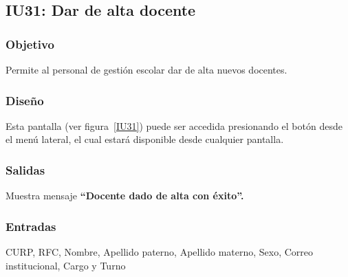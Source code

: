
\subsection{IU31: Dar de alta docente}
\subsubsection{Objetivo}
    Permite al personal de gestión escolar dar de alta nuevos docentes.
\subsubsection{Diseño}
    Esta pantalla  (ver figura~\ref{IU31}) puede ser accedida presionando el botón  desde el menú lateral, el cual estará disponible desde cualquier pantalla.

\subsubsection{Salidas}
Muestra mensaje {\bf ``Docente dado de alta con éxito''.}
\subsubsection{Entradas}
CURP, RFC, Nombre, Apellido paterno, Apellido materno, Sexo, Correo institucional, Cargo y Turno
